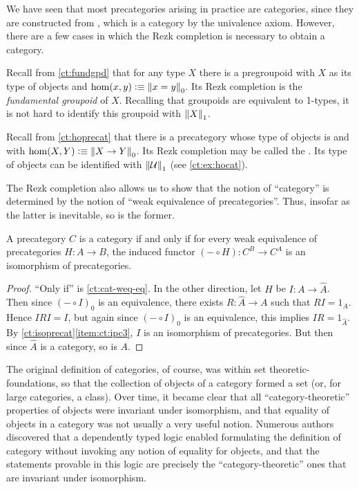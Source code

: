 We have seen that most precategories arising in practice are categories, since they are constructed from \uset, which is a category by the univalence axiom.
However, there are a few cases in which the Rezk completion is necessary to obtain a category.

\begin{eg}\label{ct:rezk-fundgpd-trunc1}
  Recall from \autoref{ct:fundgpd} that for any type $X$ there is a pregroupoid with $X$ as its type of objects and $\hom(x,y) \defeq \pizero{x=y}$.
  Its Rezk completion is the \emph{fundamental groupoid} of $X$.
  Recalling that groupoids are equivalent to 1-types, it is not hard to identify this groupoid with $\trunc1X$.
\end{eg}

\begin{eg}\label{ct:hocat}
  Recall from \autoref{ct:hoprecat} that there is a precategory whose type of objects is \type and with $\hom(X,Y) \defeq \pizero{X\to Y}$.
  Its Rezk completion may be called the .
  Its type of objects can be identified with $\trunc1\type$ (see \autoref{ct:ex:hocat}).
\end{eg}

The Rezk completion also allows us to show that the notion of ``category'' is determined by the notion of ``weak equivalence of precategories''.
Thus, insofar as the latter is inevitable, so is the former.

\begin{thm}
  A precategory $C$ is a category if and only if for every weak equivalence of precategories $H:A\to B$, the induced functor $(-\circ H):C^B \to C^A$ is an isomorphism of precategories.
\end{thm}
\begin{proof}
  ``Only if'' is \autoref{ct:cat-weq-eq}.
  In the other direction, let $H$ be $I:A\to\widehat A$.
  Then since $(-\circ I)_0$ is an equivalence, there exists $R:\widehat A\to A$ such that $RI=1_A$.
  Hence $IRI=I$, but again since $(-\circ I)_0$ is an equivalence, this implies $IR =1_{\widehat A}$.
  By \autoref{ct:isoprecat}\ref{item:ct:ipc3}, $I$ is an isomorphism of precategories.
  But then since $\widehat A$ is a category, so is $A$.
\end{proof}


\newpage

\sectionNotes

The original definition of categories, of course, was within set theoretic-foundations, so that the collection of objects of a category formed a set (or, for large categories, a class).
Over time, it became clear that all ``category-theoretic'' properties of objects were invariant under isomorphism, and that equality of objects in a category was not usually a very useful notion.
Numerous authors~\cite{blanc:eqv-log,freyd:invar-eqv,makkai:folds,makkai:comparing} discovered that a dependently typed logic enabled formulating the definition of category without invoking any notion of equality for objects, and that the statements provable in this logic are precisely the ``category-theoretic'' ones that are invariant under isomorphism.

